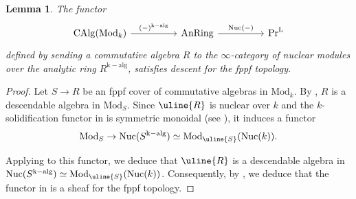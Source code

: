 \documentclass[oneside, hidelinks, 12pt, a4paper,reqno]{amsart}
\theoremstyle{plain}
\theoremstyle{definition}
\theoremstyle{plain}
\newtheorem{lemma}[lemma]{Lemma}
\newcommand{\rL}{\mathrm L}
\newcommand{\cD}{\mathscr D}
\newcommand{\Spec}{\mathrm{Spec}}
\newcommand{\cat}{$\infty$-category }
\newcommand{\LPr}{\mathrm{Pr}^\rL}
\newcommand{\Nuc}{\mathrm{Nuc}}
\newcommand{\Mod}{\mathrm{Mod}}
\newcommand{\Solid}{\blacksquare}
\begin{document}

\begin{lemma}\label{lem: descent for discrete modules}
    The functor
    \begin{equation}\label{eq: discrete descent}
        \begin{tikzcd}
	{ \mathrm{CAlg}(\Mod_{k})} && {\mathrm{AnRing}} && \LPr
	\arrow["{(-)^{\mathrm{k-alg}}}", from=1-1, to=1-3]
	\arrow["{\Nuc(-)}", from=1-3, to=1-5]
\end{tikzcd}
    \end{equation}
    defined by sending a commutative algebra $R$ to the \cat of nuclear modules over the analytic ring $R^{\mathrm{k-alg}}$, satisfies descent for the fppf topology.
\end{lemma}
\begin{proof}
    Let $S \to R$ be an fppf cover of commutative algebras in $\Mod_{k}$. By \cite[Corollary 3.33]{mathew2016galoisgroupstablehomotopy}, $R$ is a descendable algebra in $\Mod_{S}$. Since $\uline{R}$ is nuclear over $k$ and the $k$-solidification functor in  is symmetric monoidal (see ), it induces a functor
    \[
        \Mod_{S} \to \Nuc(S^{\mathrm{k-alg}})\simeq \Mod_{\uline{S}}(\Nuc(k)).
    \]
    
    Applying \cite[Corollary 3.21]{mathew2016galoisgroupstablehomotopy} to this functor, we deduce that $\uline{R}$ is a descendable algebra in $\Nuc(S^{\mathrm{k-alg}})\simeq \Mod_{\uline{S}}(\Nuc(k))$. Consequently, by \cite[Proposition 3.22]{mathew2016galoisgroupstablehomotopy}, we deduce that the functor in  is a sheaf for the fppf topology.
\end{proof}
\end{document}
